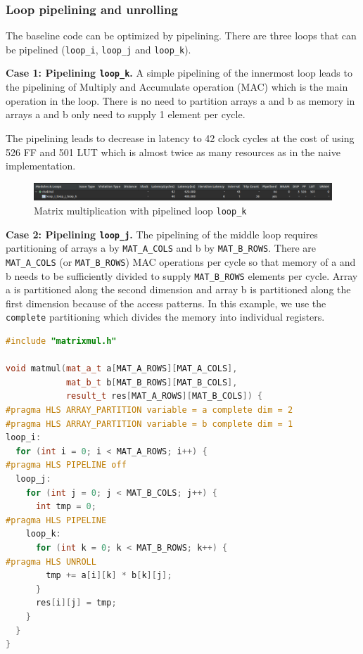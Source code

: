 \documentclass[a4paper, twoside]{report}
\theoremstyle{definition}
\numberwithin{equation}{section}
\begin{document}
\subsubsection{Loop pipelining and unrolling} \label{sec:loop_pipelining_unrolling}

The baseline code can be optimized by pipelining.
There are three loops that can be pipelined (\texttt{loop\_i}, \texttt{loop\_j} and \texttt{loop\_k}).

\textbf{Case 1: Pipelining \texttt{loop\_k}.} A simple pipelining of the innermost loop
leads to the pipelining of Multiply and Accumulate operation (MAC) which is the main operation in the loop.
There is no need to partition arrays a and b as memory in arrays a and b only need
to supply 1 element per cycle.

The pipelining leads to decrease in latency to 42 clock cycles at the cost of using
526 FF and 501 LUT which is almost twice as many resources as in the naive implementation.

\begin{figure}[h!]
    \centering
    \includegraphics[width=\textwidth]{matmul_pipek_synth.png}
    \caption{Matrix multiplication with pipelined loop \texttt{loop\_k}}
    \label{fig:matmul_pipek_synth}
\end{figure}

\textbf{Case 2: Pipelining \texttt{loop\_j}.}
The pipelining of the middle loop requires partitioning of arrays a by \texttt{MAT\_A\_COLS} and b by \texttt{MAT\_B\_ROWS}.
There are \texttt{MAT\_A\_COLS} (or \texttt{MAT\_B\_ROWS}) MAC operations per cycle so that
memory of a and b needs to be sufficiently divided to supply \texttt{MAT\_B\_ROWS} elements per cycle.
Array a is partitioned along the second dimension and array b is partitioned along the first dimension
because of the access patterns.
In this example, we use the \texttt{complete} partitioning which divides the memory into
individual registers.


\begin{lstlisting}[language=c++,numbers=none]
#include "matrixmul.h"

void matmul(mat_a_t a[MAT_A_ROWS][MAT_A_COLS],
            mat_b_t b[MAT_B_ROWS][MAT_B_COLS],
            result_t res[MAT_A_ROWS][MAT_B_COLS]) {
#pragma HLS ARRAY_PARTITION variable = a complete dim = 2
#pragma HLS ARRAY_PARTITION variable = b complete dim = 1
loop_i:
  for (int i = 0; i < MAT_A_ROWS; i++) {
#pragma HLS PIPELINE off
  loop_j:
    for (int j = 0; j < MAT_B_COLS; j++) {
      int tmp = 0;
#pragma HLS PIPELINE
    loop_k:
      for (int k = 0; k < MAT_B_ROWS; k++) {
#pragma HLS UNROLL
        tmp += a[i][k] * b[k][j];
      }
      res[i][j] = tmp;
    }
  }
}
\end{lstlisting}
\end{document}
